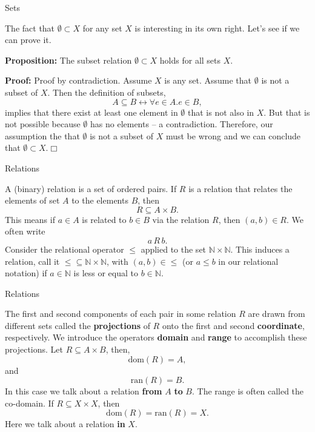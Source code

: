 \documentclass{beamer}
\begin{document}
\begin{frame}{Sets}

\scriptsize
The fact that $\emptyset \subset X$ for any set $X$ is interesting in its own right.  Let's see if we can prove it.

\vspace{.1in}
{\bf Proposition:} The subset relation $\emptyset \subset X$ holds for all sets $X$.

\vspace{.1in}

{\bf Proof:} Proof by contradiction. Assume $X$ is any set. Assume that $\emptyset$ is not a subset of $X$.
Then the definition of subsets,
\[
A \subseteq B \leftrightarrow \forall e \in A. e \in B,
\]
implies that there exist at least one element in $\emptyset$ that is not also in $X$.  But that is not possible
because $\emptyset$ has no elements -- a contradiction.  Therefore, our assumption the
that $\emptyset$ is not a subset of $X$ must be wrong and we can conclude that $\emptyset \subset X$.$\Box$

\end{frame}


\begin{frame}{Relations}

A (binary) relation is a set of ordered pairs.  If $R$ is a relation that relates the elements of
set $A$ to the elements $B$, then
\[
R \subseteq A\times B.
\]
This means if $a\in A$ is related to $b\in B$ via the relation $R$, then $(a,b)\in R$.  We often
write
\[
a\, R\, b.
\]
Consider the relational operator $\le$ applied to the set ${\mathbb N}\times {\mathbb N}$.
This induces a relation, call it $\le \subseteq {\mathbb N}\times {\mathbb N}$, with
$(a,b) \in \le$ (or $a \le b$ in our relational notation) if $a\in{\mathbb N}$ is less or equal to $b\in{\mathbb N}$.
\end{frame}

\begin{frame}{Relations}

The first and second components of each pair in some relation $R$ are drawn from different sets called
the {\bf projections} of $R$ onto the first and second {\bf coordinate}, respectively.  We introduce
the operators {\bf domain} and {\bf range} to accomplish these projections.  Let $R\subseteq A\times B$,
then,
\[
\mbox{dom}(R) = A,
\]
and
\[
\mbox{ran}(R) = B.
\]
In this case we talk about a relation {\bf from} $A$ {\bf to} $B$.  The range is often
called the co-domain. If $R\subseteq X\times X$, then
\[
\mbox{dom}(R) = \mbox{ran}(R) = X.
\]
Here we talk about a relation {\bf in} $X$.
\end{frame}
\end{document}
